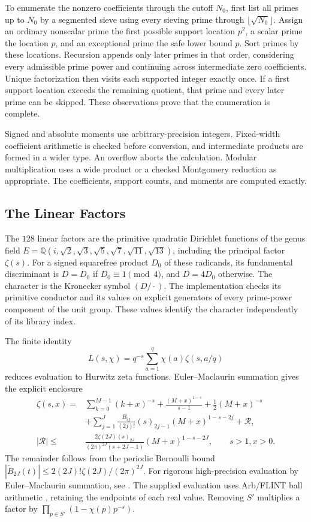 To enumerate the nonzero coefficients through the cutoff $N_0$, first
list all primes up to $N_0$ by a segmented sieve using every sieving
prime through $\lfloor\sqrt{N_0}\rfloor$. Assign an ordinary nonscalar prime the
first possible support location $p^2$, a scalar prime the location $p$,
and an exceptional prime the safe lower bound $p$. Sort primes by these
locations. Recursion appends only later primes in that order, considering
every admissible prime power and continuing across intermediate zero
coefficients. Unique factorization then visits each supported integer
exactly once. If a first support location exceeds the remaining quotient,
that prime and every later prime can be skipped. These observations prove that
the enumeration is complete.

Signed and absolute moments use arbitrary-precision integers. Fixed-width
coefficient arithmetic is checked before conversion, and intermediate
products are formed in a wider type. An overflow aborts the calculation.
Modular multiplication uses a wide product or a checked Montgomery
reduction as appropriate. The coefficients, support counts, and moments are computed exactly.

\subsection{The Linear Factors}

The $128$ linear factors are the primitive quadratic Dirichlet functions
of the genus field
$E=\mathbb Q(i,\sqrt2,\sqrt3,\sqrt5,\sqrt7,\sqrt{11},\sqrt{13})$,
including the principal factor $\zeta(s)$. For a signed squarefree
product $D_0$ of these radicands, its fundamental discriminant is
$D=D_0$ if $D_0\equiv1\pmod4$, and $D=4D_0$ otherwise.
The character is the Kronecker symbol $(D/\cdot)$.
The implementation checks its primitive conductor and its values on
explicit generators of every prime-power component of the unit group.
These values identify the character independently of its library index.

The finite identity
\begin{equation}\label{an:dirichlet-hurwitz}
 L(s,\chi)=q^{-s}\sum_{a=1}^{q}\chi(a)\zeta(s,a/q)
\end{equation}
reduces evaluation to Hurwitz zeta functions. Euler--Maclaurin summation
gives the explicit enclosure
\begin{align*}
 \zeta(s,x)={}&\sum_{k=0}^{M-1}(k+x)^{-s}
 +\frac{(M+x)^{1-s}}{s-1}+\frac12(M+x)^{-s}\\
 &+\sum_{j=1}^{J}\frac{B_{2j}}{(2j)!}(s)_{2j-1}
                     (M+x)^{1-s-2j}+\mathcal R,\\
 |\mathcal R|\leq{}&
 \frac{2\zeta(2J)(s)_{2J}}{(2\pi)^{2J}(s+2J-1)}
                       (M+x)^{1-s-2J},
 \qquad s>1, x>0.
\end{align*}
The remainder follows from the periodic Bernoulli bound
$|\widetilde B_{2J}(t)|\leq2(2J)!\zeta(2J)/(2\pi)^{2J}$.
For rigorous high-precision evaluation by Euler--Maclaurin summation,
see \cite{Johansson2015Hurwitz}. The supplied evaluation uses Arb/FLINT
ball arithmetic \cite{Johansson2017}, retaining the endpoints of each
real value.
Removing $S'$ multiplies a factor by
$\prod_{p\in S'}(1-\chi(p)p^{-s})$.


